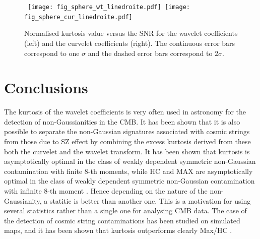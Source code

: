 \begin{figure}[htb]
\centerline{
 \hbox{
\texttt{[image: fig\_sphere\_wt\_linedroite.pdf]}%
\texttt{[image: fig\_sphere\_cur\_linedroite.pdf]}
}}
\caption{Normalised kurtosis value versus the SNR for the wavelet coefficients (left) and the curvelet coefficients (right). 
The continuous error bars correspond to one $\sigma$ and the dashed error bars correspond to $2\sigma$.}
\label{fig_wtcur_sphere_linegauss}
\end{figure}

\section{Conclusions}

The kurtosis of the wavelet coefficients is very often used in astronomy for the detection of non-Gaussianities in the CMB. It has been 
shown \citep{starck:sta03_1} that it is also possible to separate the non-Gaussian signatures associated with cosmic strings from those 
due to SZ effect by combining the excess kurtosis derived from these both the curvelet and the wavelet transform. It has been shown that 
kurtosis is asymptotically optimal in the class of weakly dependent symmetric non-Gaussian contamination with finite 8-th moments, while 
HC and MAX are asymptotically optimal in the class of weakly dependent symmetric non-Gaussian contamination with infinite 8-th moment \citep{starck:jin05}. 
Hence depending on the nature of the non-Gaussianity, a statitic is better than another one. This is a motivation for using several statistics 
rather than a single one for analysing CMB data. The case of the detection of cosmic string contaminations has been studied on simulated maps, 
and it has been shown that kurtosis outperforms clearly Max/HC \citep{starck:jin05}.  




